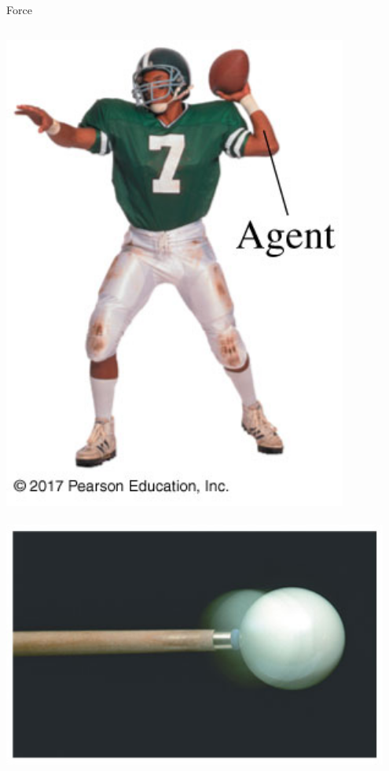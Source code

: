 \documentclass{beamer}
\begin{document}
\begin{frame}{Force}
\begin{columns}
\begin{column}{0.4\textwidth}
\begin{center}
   \includegraphics[width=0.85\textwidth]{../figures/05_Pg111_UnFigure3.jpg}
   \\~\\
   \includegraphics[width=0.95\textwidth]{../figures/05_Pg111_UnFigure4.jpg}

\end{center}
\end{column}
\end{columns}
\end{frame}
\end{document}
